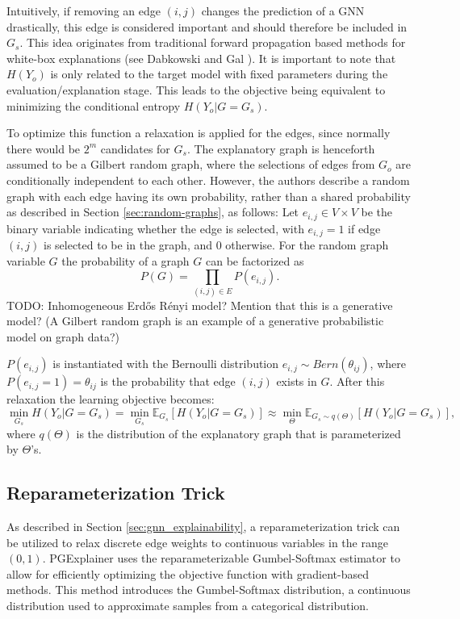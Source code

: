 Intuitively, if removing an edge $(i,j)$ changes the prediction of a GNN drastically, this edge is considered important and should therefore be included in $G_s$. This idea originates from traditional forward propagation based methods for white-box explanations (see Dabkowski and Gal \cite{dabkowski2017real}).
It is important to note that $H(Y_o)$ is only related to the target model with fixed parameters during the evaluation/explanation stage. This leads to the objective being equivalent to minimizing the conditional entropy $H(Y_o|G=G_s)$. \bigskip

To optimize this function a relaxation is applied for the edges, since normally there would be $2^m$ candidates for $G_s$. The explanatory graph is henceforth assumed to be a Gilbert random graph, where the selections of edges from $G_o$ are conditionally independent to each other. However, the authors describe a random graph with each edge having its own probability, rather than a shared probability as described in Section \ref{sec:random-graphs}, as follows: Let $e_{i,j}\in V \times V$ be the binary variable indicating whether the edge is selected, with $e_{i,j} = 1$ if edge $(i,j)$ is selected to be in the graph, and 0 otherwise. For the random graph variable $G$ the probability of a graph $G$ can be factorized as 
\begin{equation}
    P(G) = \prod_{(i,j)\in E}P(e_{i,j}).
\end{equation}
TODO: Inhomogeneous Erdős Rényi model? Mention that this is a generative model? (A Gilbert random graph is an example of a generative probabilistic model on graph data?)

 $P(e_{i,j})$ is instantiated with the Bernoulli distribution $e_{i,j} \sim Bern(\theta_{ij})$, where $P(e_{i,j} = 1) = \theta_{ij}$ is the probability that edge $(i,j)$ exists in $G$.
After this relaxation the learning objective becomes:
\begin{equation}
    \label{eq:init_learning_obj}
    \min_{G_s}H(Y_o|G = G_s) = \min_{G_s} \mathbb{E}_{G_s}[H(Y_o|G = G_s)] \approx \min_{\Theta} \mathbb{E}_{G_s \sim q(\Theta)}[H(Y_o|G = G_s)],
\end{equation}
where $q(\Theta)$ is the distribution of the explanatory graph that is parameterized by $\Theta$'s.

\subsection{Reparameterization Trick}
\label{sec:Reparameterization_Trick}
As described in Section \ref{sec:gnn_explainability}, a reparameterization trick can be utilized to relax discrete edge weights to continuous variables in the range $(0,1)$. PGExplainer uses the reparameterizable Gumbel-Softmax estimator \cite{jang2016categorical} to allow for efficiently optimizing the objective function with gradient-based methods. This method introduces the Gumbel-Softmax distribution, a continuous distribution used to approximate samples from a categorical distribution. 

